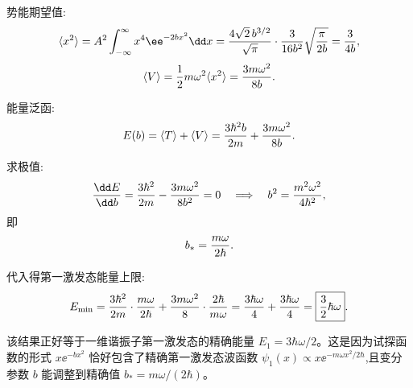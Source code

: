 \begin{question}
\begin{solution}
势能期望值:
\[
\langle x^2\rangle=A^2\int_{-\infty}^\infty x^4\ee^{-2bx^2}\dd x
={4\sqrt2\,b^{3/2}\over\sqrt\pi}\cdot{3\over16b^2}\sqrt{\pi\over2b}
={3\over4b},
\]
\[
\langle V\rangle={1\over2}m\omega^2\langle x^2\rangle={3m\omega^2\over8b}.
\]

能量泛函:
\[
E(b)=\langle T\rangle+\langle V\rangle
={3\hbar^2b\over2m}+{3m\omega^2\over8b}.
\]

求极值:
\[
{\dd E\over\dd b}={3\hbar^2\over2m}-{3m\omega^2\over8b^2}=0
\quad\Longrightarrow\quad
b^2={m^2\omega^2\over4\hbar^2},
\]
即
\[
b_*={m\omega\over2\hbar}.
\]

代入得第一激发态能量上限:
\[
E_{\min}={3\hbar^2\over2m}\cdot{m\omega\over2\hbar}
+{3m\omega^2\over8}\cdot{2\hbar\over m\omega}
={3\hbar\omega\over4}+{3\hbar\omega\over4}
=\boxed{{3\over2}\hbar\omega}.
\]

该结果正好等于一维谐振子第一激发态的精确能量 $E_1=3\hbar\omega/2$。这是因为试探函数的形式 $x\ee^{-bx^2}$ 恰好包含了精确第一激发态波函数 $\psi_1(x)\propto x \ee^{-m\omega x^2/2\hbar}$,且变分参数 $b$ 能调整到精确值 $b_*=m\omega/(2\hbar)$。
\end{solution}
\end{question}


